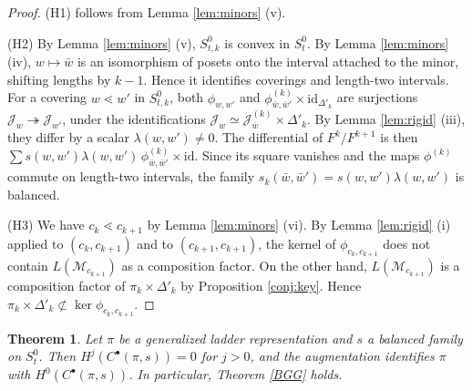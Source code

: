 \documentclass[a4paper,12pt,leqno]{amsart}
\newcommand{\caJ}{\mathcal{J}}
\newcommand{\caM}{\mathcal{M}}
\theoremstyle{plain}
\newtheorem{thm}{Theorem}[section]
\theoremstyle{definition}
\theoremstyle{definition}
\begin{document}
\begin{proof}
(H1) follows from Lemma \ref{lem:minors} (v).

(H2) By Lemma \ref{lem:minors} (v), $S^0_{t,k}$ is convex in $S^0_t$. By Lemma \ref{lem:minors}
(iv), $w\mapsto\bar w$
 is an isomorphism of posets onto the interval attached to the minor, shifting lengths by $k-1$.
 Hence it identifies coverings
  and length-two intervals. For a covering $w\lessdot w'$ in $S^0_{t,k}$, both $\phi_{w,w'}$ and
   $\phi^{(k)}_{\bar w,\bar w'}\times\mathrm{id}_{\Delta'_k}$ are surjections
   $\caJ_w\twoheadrightarrow\caJ_{w'}$,
   under the identifications $\caJ_w\simeq\caJ^{(k)}_{\bar w}\times\Delta'_k$. By Lemma \ref{lem:rigid} (iii),
    they differ by a scalar $\lambda(w,w')\neq 0$. The differential of $F^k/F^{k+1}$ is then
     $\sum s(w,w')\lambda(w,w')\,\phi^{(k)}_{\bar w,\bar w'}\times\mathrm{id}$. Since its square vanishes
      and the maps $\phi^{(k)}$ commute on length-two intervals, the family $s_k(\bar w,\bar
      w')=s(w,w')\lambda(w,w')$ is balanced.

(H3) We have $c_k\lessdot c_{k+1}$ by Lemma \ref{lem:minors} (vi). By Lemma \ref{lem:rigid} (i)
 applied to $(c_k,c_{k+1})$ and to $(c_{k+1},c_{k+1})$, the kernel of $\phi_{c_k,c_{k+1}}$ does not contain
 $L(\caM_{c_{k+1}})$ as a composition factor. On the other hand, $L(\caM_{c_{k+1}})$ is a composition factor
 of $\pi_k\times\Delta'_k$ by Proposition \ref{conj:key}. Hence
 $\pi_k\times\Delta'_k\not\subset\ker\phi_{c_k,c_{k+1}}$.
\end{proof}

\begin{thm}\label{thm:main} Let $\pi$ be a generalized ladder representation and $s$ a balanced
family on $S_t^0$.
 Then $H^j(C^\bullet(\pi,s))=0$ for $j>0$, and the augmentation identifies $\pi$ with
 $H^0(C^\bullet(\pi,s))$. In particular,
 Theorem \ref{BGG} holds.
\end{thm}
\end{document}
